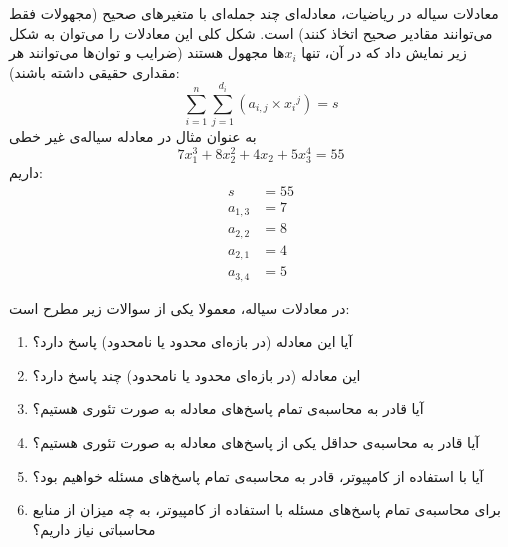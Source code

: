 \begin{EXTRA}{معادلات سیاله}
    \p
    در ریاضیات،
    معادله‌ای چند جمله‌ای با متغیرهای صحیح
    (مجهولات فقط می‌توانند مقادیر صحیح اتخاذ کنند)
    است. شکل کلی این معادلات را می‌توان به شکل زیر نمایش داد
    که در آن، تنها ‌$x_i$ها مجهول هستند
    (ضرایب و توان‌ها می‌توانند هر مقداری حقیقی داشته باشند): 
    $$\sum\limits_{i=1}^{n} \sum\limits_{j=1}^{d_i} ({a_{i,j}} \times {x_i}^{j}) = s$$
    \p
به عنوان مثال در معادله سیاله‌ی غیر خطی 
$$7x_1^3 + 8x_2^2 + 4x_2 + 5x_3^4 = 55$$
داریم:
\begin{align*}
    s &= 55\\
    a_{1, 3} &= 7\\
    a_{2, 2} &= 8\\
    a_{2, 1} &= 4\\
    a_{3, 4} &= 5
\end{align*}


    \p
        در معادلات سیاله، معمولا یکی از سوالات زیر مطرح است:
        \begin{enumerate}
            \item 
            آیا این معادله (در بازه‌ای محدود یا نامحدود) پاسخ دارد؟
            \item 
            این معادله (در بازه‌ای محدود یا نامحدود) چند پاسخ دارد؟
            \item 
            آیا قادر به محاسبه‌ی تمام پاسخ‌های معادله به صورت تئوری هستیم؟
            \item 
            آیا قادر به محاسبه‌ی حداقل یکی از پاسخ‌های معادله به صورت تئوری هستیم؟
            \item 
            آیا با استفاده از کامپیوتر، قادر به محاسبه‌ی تمام پاسخ‌های مسئله خواهیم بود؟
            \item 
            برای محاسبه‌ی تمام پاسخ‌های مسئله با استفاده از کامپیوتر، به چه میزان از منابع محاسباتی نیاز داریم؟
        \end{enumerate}
\end{EXTRA}